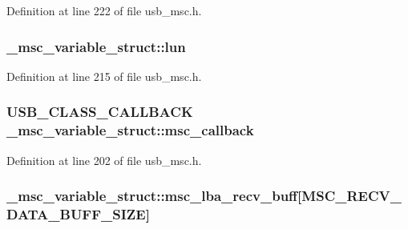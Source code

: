 Definition at line 222 of file usb\+\_\+msc.\+h.

\subsubsection[{\texorpdfstring{lun}{lun}}]{ \+\_\+msc\+\_\+variable\+\_\+struct\+::lun}\hypertarget{struct__msc__variable__struct_a4c796ff94ca53f300c896c0a3f3a2d82}{}\label{struct__msc__variable__struct_a4c796ff94ca53f300c896c0a3f3a2d82}


Definition at line 215 of file usb\+\_\+msc.\+h.

\subsubsection[{\texorpdfstring{msc\+\_\+callback}{msc_callback}}]{\setlength{\rightskip}{0pt plus 5cm}U\+S\+B\+\_\+\+C\+L\+A\+S\+S\+\_\+\+C\+A\+L\+L\+B\+A\+CK \+\_\+msc\+\_\+variable\+\_\+struct\+::msc\+\_\+callback}\hypertarget{struct__msc__variable__struct_a2e8b209bd4a9b957386bef360ad58bb8}{}\label{struct__msc__variable__struct_a2e8b209bd4a9b957386bef360ad58bb8}


Definition at line 202 of file usb\+\_\+msc.\+h.

\subsubsection[{\texorpdfstring{msc\+\_\+lba\+\_\+recv\+\_\+buff}{msc_lba_recv_buff}}]{ \+\_\+msc\+\_\+variable\+\_\+struct\+::msc\+\_\+lba\+\_\+recv\+\_\+buff\mbox{[}{\bf M\+S\+C\+\_\+\+R\+E\+C\+V\+\_\+\+D\+A\+T\+A\+\_\+\+B\+U\+F\+F\+\_\+\+S\+I\+ZE}\mbox{]}}\hypertarget{struct__msc__variable__struct_a43b4448e9a478ac4a0e39cfe233c4aaa}{}\label{struct__msc__variable__struct_a43b4448e9a478ac4a0e39cfe233c4aaa}


